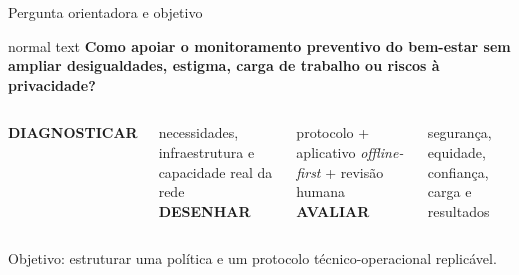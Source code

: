 \documentclass[aspectratio=169,11pt]{beamer}
\begin{document}
\begin{frame}{Pergunta orientadora e objetivo}
  \vspace{1mm}
  \begin{beamercolorbox}[wd=\textwidth,sep=4mm,rounded=true]{normal text}
    \centering\color{NeesWine}\fontsize{14}{17}\selectfont\bfseries
    Como apoiar o monitoramento preventivo do bem-estar sem ampliar desigualdades, estigma, carga de trabalho ou riscos à privacidade?
  \end{beamercolorbox}
  \vspace{5mm}
  \begin{columns}[T,onlytextwidth]
    \centering
      {\color{NeesWine}\bfseries DIAGNOSTICAR}\par\smallskip
      {\small necessidades, infraestrutura e capacidade real da rede}
    \centering
      {\color{NeesRed}\bfseries DESENHAR}\par\smallskip
      {\small protocolo + aplicativo \textit{offline-first} + revisão humana}
    \centering
      {\color{NeesOrange}\bfseries AVALIAR}\par\smallskip
      {\small segurança, equidade, confiança, carga e resultados}
  \end{columns}
  \vfill
  \centering\color{NeesDark}
  Objetivo: estruturar uma política e um protocolo técnico-operacional replicável.
\end{frame}
\end{document}
